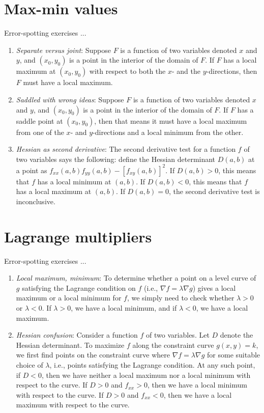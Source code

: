 \documentclass[10pt]{amsart}
\begin{document}
\section{Max-min values}


Error-spotting exercises ...

\begin{enumerate}
\item {\em Separate versus joint}: Suppose $F$ is a function of two
  variables denoted $x$ and $y$, and $(x_0,y_0)$ is a point in the
  interior of the domain of $F$. If $F$ has a local maximum at
  $(x_0,y_0)$ with respect to both the $x$- and the $y$-directions,
  then $F$ must have a local maximum.
\item {\em Saddled with wrong ideas}: Suppose $F$ is a function of two
  variables denoted $x$ and $y$, and $(x_0,y_0)$ is a point in the
  interior of the domain of $F$. If $F$ has a saddle point at
  $(x_0,y_0)$, then that means it must have a local maximum from one
  of the $x$- and $y$-directions and a local minimum from the other.
\item {\em Hessian as second derivative}: The second derivative test
  for a function $f$ of two variables says the following: define the
  Hessian determinant $D(a,b)$ at a point as $f_{xx}(a,b)f_{yy}(a,b) -
  [f_{xy}(a,b)]^2$. If $D(a,b) > 0$, this means that $f$ has a local
  minimum at $(a,b)$. If $D(a,b) < 0$, this means that $f$ has a local
  maximum at $(a,b)$. If $D(a,b) = 0$, the second derivative test is
  inconclusive.
\end{enumerate}
\section{Lagrange multipliers}


Error-spotting exercises ...

\begin{enumerate}
\item {\em Local maximum, minimum}: To determine whether a point on a
  level curve of $g$ satisfying the Lagrange condition on $f$ (i.e.,
  $\nabla f = \lambda \nabla g$) gives a local maximum or a local
  minimum for $f$, we simply need to check whether $\lambda > 0$ or
  $\lambda < 0$. If $\lambda > 0$, we have a local minimum, and if
  $\lambda < 0$, we have a local maximum.
\item {\em Hessian confusion}: Consider a function $f$ of two
  variables. Let $D$ denote the Hessian determinant. To maximize $f$
  along the constraint curve $g(x,y) = k$, we first find points on the
  constraint curve where $\nabla f = \lambda \nabla g$ for some
  suitable choice of $\lambda$, i.e., points satisfying the Lagrange
  condition. At any such point, if $D < 0$, then we have neither a
  local maximum nor a local minimum with respect to the curve. If $D >
  0$ and $f_{xx} > 0$, then we have a local minimum with respect to
  the curve. If $D > 0$ and $f_{xx} < 0$, then we have a local maximum
  with respect to the curve.
\end{enumerate}
\end{document}
